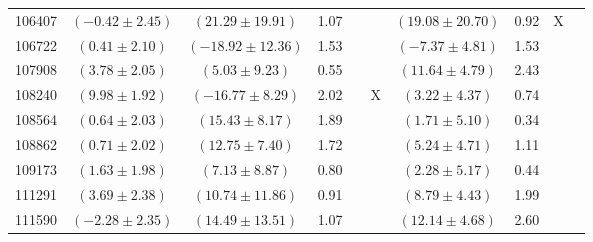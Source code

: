 \documentclass [10pt, twoside] {uwthesis}[2012/04/02]
\begin{document}
{\begin{longtable}[t]{|c|c|cccc|cccc|}
106407	&  $(	-0.42	  \pm  	2.45	)$  &  $(	21.29	  \pm  	19.91	)$  &  	1.07	  &  		  &  		  &  $(	19.08	  \pm  	20.70	)$  &  	0.92	  &  	X	  &  		  \\
106722	&  $(	0.41	  \pm  	2.10	)$  &  $(	-18.92	  \pm  	12.36	)$  &  	1.53	  &  		  &  		  &  $(	-7.37	  \pm  	4.81	)$  &  	1.53	  &  		  &  		  \\
107908	&  $(	3.78	  \pm  	2.05	)$  &  $(	5.03	  \pm  	9.23	)$  &  	0.55	  &  		  &  		  &  $(	11.64	  \pm  	4.79	)$  &  	2.43	  &  		  &  		  \\
108240	&  $(	9.98	  \pm  	1.92	)$  &  $(	-16.77	  \pm  	8.29	)$  &  	2.02	  &  		  &  	X	  &  $(	3.22	  \pm  	4.37	)$  &  	0.74	  &  		  &  		  \\
108564	&  $(	0.64	  \pm  	2.03	)$  &  $(	15.43	  \pm  	8.17	)$  &  	1.89	  &  		  &  		  &  $(	1.71	  \pm  	5.10	)$  &  	0.34	  &  		  &  		  \\
108862	&  $(	0.71	  \pm  	2.02	)$  &  $(	12.75	  \pm  	7.40	)$  &  	1.72	  &  		  &  		  &  $(	5.24	  \pm  	4.71	)$  &  	1.11	  &  		  &  		  \\
109173	&  $(	1.63	  \pm  	1.98	)$  &  $(	7.13	  \pm  	8.87	)$  &  	0.80	  &  		  &  		  &  $(	2.28	  \pm  	5.17	)$  &  	0.44	  &  		  &  		  \\
111291	&  $(	3.69	  \pm  	2.38	)$  &  $(	10.74	  \pm  	11.86	)$  &  	0.91	  &  		  &  		  &  $(	8.79	  \pm  	4.43	)$  &  	1.99	  &  		  &  		  \\
111590	&  $(	-2.28	  \pm  	2.35	)$  &  $(	14.49	  \pm  	13.51	)$  &  	1.07	  &  		  &  		  &  $(	12.14	  \pm  	4.68	)$  &  	2.60	  &  		  &  		  \\ \hline
\end{longtable}
}

\newpage
\end{document}
